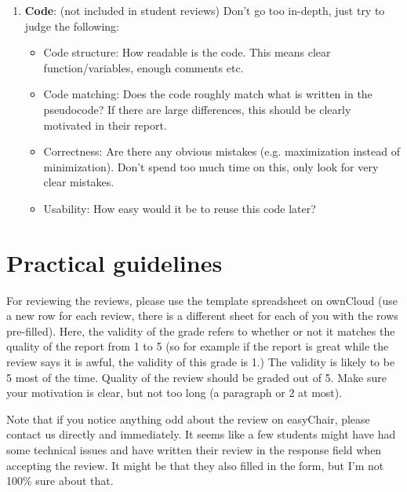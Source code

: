 \documentclass[runningheads]{llncs}
\begin{document}
\begin{enumerate}
\begin{itemize}
    \end{itemize}
    \item \textbf{Code}: (not included in student reviews) Don't go too in-depth, just try to judge the following:
    \begin{itemize}
        \item Code structure: How readable is the code. This means clear function/variables, enough comments etc.
        \item Code matching: Does the code roughly match what is written in the pseudocode? If there are large differences, this should be clearly motivated in their report.
        \item Correctness: Are there any obvious mistakes (e.g. maximization instead of minimization). Don't spend too much time on this, only look for very clear mistakes.
        \item Usability: How easy would it be to reuse this code later?
    \end{itemize}
\end{enumerate}

\section{Practical guidelines}
For reviewing the reviews, please use the template spreadsheet on ownCloud (use a new row for each review, there is a different sheet for each of you with the rows pre-filled). Here, the validity of the grade refers to whether or not it matches the quality of the report from 1 to 5 (so for example if the report is great while the review says it is awful, the validity of this grade is 1.) The validity is likely to be 5 most of the time. Quality of the review should be graded out of 5. Make sure your motivation is clear, but not too long (a paragraph or 2 at most).

Note that if you notice anything odd about the review on easyChair, please contact us directly and immediately. It seems like a few students might have had some technical issues and have written their review in the response field when accepting the review. It might be that they also filled in the form, but I'm not 100\% sure about that.
\end{document}
